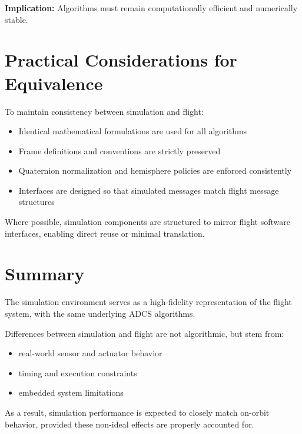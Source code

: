 \textbf{Implication:}  
Algorithms must remain computationally efficient and numerically stable.

\section{Practical Considerations for Equivalence}

To maintain consistency between simulation and flight:
\begin{itemize}
	\item Identical mathematical formulations are used for all algorithms
	\item Frame definitions and conventions are strictly preserved
	\item Quaternion normalization and hemisphere policies are enforced consistently
	\item Interfaces are designed so that simulated messages match flight message structures
\end{itemize}

Where possible, simulation components are structured to mirror flight software interfaces, enabling direct reuse or minimal translation.

\section{Summary}

The simulation environment serves as a high-fidelity representation of the flight system, with the same underlying ADCS algorithms.

Differences between simulation and flight are not algorithmic, but stem from:
\begin{itemize}
	\item real-world sensor and actuator behavior
	\item timing and execution constraints
	\item embedded system limitations
\end{itemize}

As a result, simulation performance is expected to closely match on-orbit behavior, provided these non-ideal effects are properly accounted for.